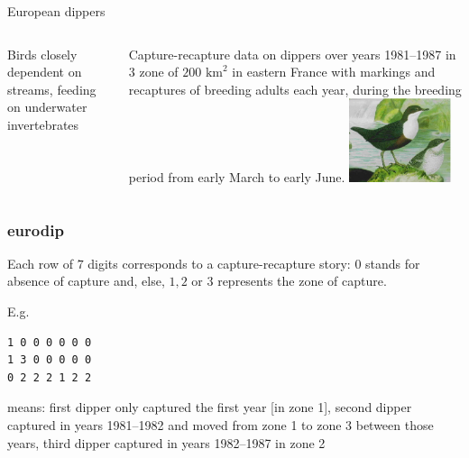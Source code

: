 \begin{slide}

\begin{block}{European dippers}
\begin{columns}
Birds closely dependent on streams, feeding on underwater invertebrates

Capture-recapture data on dippers over  years 1981--1987
in $3$ zone of $200$ $\text{km}^2$ in eastern France with markings and recaptures
of breeding adults each year, during the breeding period from early March to early June.
\includegraphics[width=3cm,height=3truecm]{figures/Dipper.eps}
\end{columns}
\end{block}

\end{slide}
\begin{frame}[fragile]
\frametitle{{\sf eurodip}}

Each row of $7$ digits corresponds to a capture-recapture story: 
$0$ stands for absence of capture and, else,
$1,2$ or $3$ represents the zone of capture.

\vs\pause
E.g.
\begin{verbatim}
1 0 0 0 0 0 0
1 3 0 0 0 0 0
0 2 2 2 1 2 2
\end{verbatim}
means: first dipper only captured the first year [in zone 1], second dipper
captured in years 1981--1982 and moved from zone 1 to zone 3 between those years, third dipper
captured in years 1982--1987 in zone 2

\end{frame}
